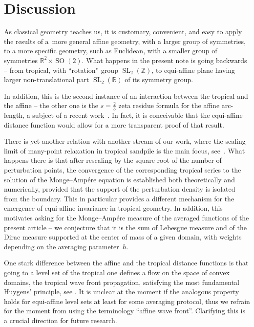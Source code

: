 \documentclass[pdftex]{sigma}
\numberwithin{equation}{section}
\theoremstyle{definition}
\begin{document}
\section{Discussion}
As classical geometry teaches us, it is customary, convenient, and easy to apply the results of a~more general affine geometry, with a larger group of symmetries, to a more specific geometry, such as Euclidean, with a smaller group of symmetries $\mathbb{R}^2\rtimes \operatorname{SO}(2)$. What happens in the present note is going backwards -- from tropical, with ``rotation'' group $\operatorname{SL}_2(\mathbb{Z})$, to equi-affine plane having larger non-translational part $\operatorname{SL}_2(\mathbb{R})$ of its symmetry group.

In addition, this is the second instance of an interaction between the tropical and the affine -- the other one is the $s=\frac{2}{3}$ zeta  residue formula for the affine arc-length, a subject of a recent work~\cite{us_zeta}. In fact, it is conceivable that the equi-affine distance function would allow for a more transparent proof of that result.

There is yet another relation with another stream of our work, where the scaling limit of many-point relaxation in tropical sandpile is the main focus, see~\cite{KLSS26}. What happens there is that after rescaling by the square root of the number of perturbation points, the convergence of the corresponding tropical series to the solution of the Monge--Amp\'ere equation is established both theoretically and numerically, provided that the support of the perturbation density is isolated from the boundary. This in particular provides a different mechanism for the emergence of equi-affine invariance in tropical geometry. In addition, this motivates asking for the Monge--Amp\'ere measure of the averaged functions of the present article -- we conjecture that it is the sum of Lebesgue measure and of the Dirac measure supported at the center of mass of a given domain, with weights depending on the averaging parameter~$h$.

One stark difference between the affine and the tropical distance functions is that going to a level set of the tropical one defines a flow on the space of convex domains, the tropical wave front propagation, satisfying the most fundamental Huygens' principle, see \cite{mikhalkin2023wave}. It is unclear at the moment if the analogous property holds for equi-affine level sets at least for some averaging protocol, thus we refrain for the moment from using the terminology ``affine wave front''. Clarifying this is a crucial direction for future research.
\end{document}

